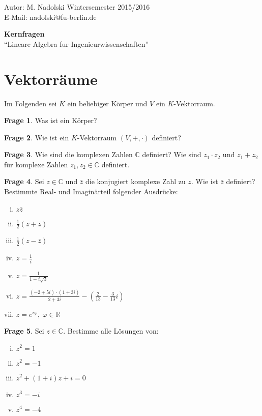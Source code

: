 \documentclass{scrartcl}
\theoremstyle{definition}
\newtheorem{frage}{Frage}
\newcommand{\R}{\mathbb R}
\newcommand{\C}{\mathbb C}
\let\tmpphi\phi
\let\phi\varphi
\let\varphi\tmpphi
\begin{document}
{\raggedleft Autor: M. Nadolski \hfill Wintersemester 2015/2016}\\
E-Mail: nadolski@fu-berlin.de

\begin{center}
\LARGE\textbf {Kernfragen}\\
\large ``Lineare Algebra fur Ingenieurwissenschaften''
\end{center}

\section {Vektorräume}

Im Folgenden sei $K$ ein beliebiger Körper und $V$ ein $K$-Vektorraum.

\begin{frage}
Was ist ein Körper?
\end{frage}

\begin{frage}
Wie ist ein $K$-Vektorraum $(V, +, \cdot)$ definiert?
\end{frage}

\begin{frage}
Wie sind die komplexen Zahlen $\C$ definiert? Wie sind $z_1 \cdot z_2$
und $z_1 + z_2$ für komplexe Zahlen $z_1, z_2 \in \C$ definiert.
\end{frage}

\begin{frage}
Sei $z \in \C$ und $\bar z$ die konjugiert komplexe Zahl zu $z$. Wie ist
$\bar z$ definiert? Bestimmte Real- und Imaginärteil folgender Ausdrücke:
\begin{multicols}{2}
\begin{enumerate}[(i)]
    \item $z \bar z$
    \item $\frac 12 ( z + \bar z )$
    \item $\frac 12 ( z - \bar z )$
    \item $z = \frac 1 i$
    \item $z = \frac 1 {1 - i \sqrt 3}$
    \item $z = \frac {(-2 + 5i) \cdot (1 + 3i)}{2 + 3i} 
             - \left( \frac 2 {13} - \frac 3 {13} i \right)$
    \item $z = e^{i \phi},\: \phi \in \R$
\end{enumerate}
\end{multicols}
\end{frage}

\begin{frage}
Sei $z \in \C$. Bestimme alle Lösungen von:
\begin{multicols}{2}
\begin{enumerate}[(i)]
    \item $z^2 = 1$
    \item $z^2 = -1$
    \item $z^2 + (1 + i) z + i = 0$
    \item $z^3 = -i$
    \item $z^4 = -4$
\end{enumerate}
\end{multicols}
\end{frage}
\end{document}
